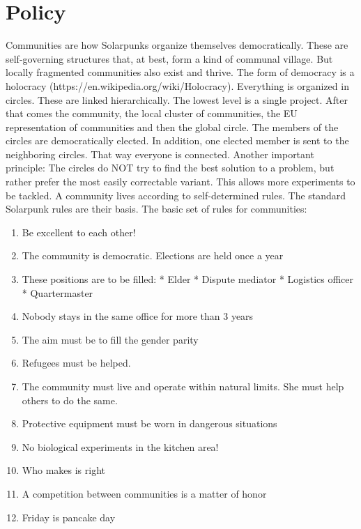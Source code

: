 \section{Policy}
Communities are how Solarpunks organize themselves democratically. These are self-governing structures that, at best, form a kind of communal village. But locally fragmented communities also exist and thrive. The form of democracy is a holocracy (https://en.wikipedia.org/wiki/Holocracy). Everything is organized in circles. These are linked hierarchically. The lowest level is a single project. After that comes the community, the local cluster of communities, the EU
representation of communities and then the global circle.
The members of the circles are democratically elected. In addition, one elected member is sent to the neighboring circles. That way everyone is connected. Another important principle: The circles do NOT try to find the best solution to a problem, but rather prefer the most easily correctable variant. This allows more experiments to be tackled.
A community lives according to self-determined rules. The standard Solarpunk rules are their basis.
The basic set of rules for communities:
\begin{enumerate}
    \item Be excellent to each other!
    \item The community is democratic. Elections are held once a year
    \item These positions are to be filled: * Elder * Dispute mediator * Logistics officer * Quartermaster
    \item Nobody stays in the same office for more than 3 years
    \item The aim must be to fill the gender parity
    \item Refugees must be helped.
    \item The community must live and operate within natural limits. She must help others to do the same.
    \item Protective equipment must be worn in dangerous situations
    \item No biological experiments in the kitchen area!
    \item Who makes is right
    \item A competition between communities is a matter of honor
    \item Friday is pancake day
\end{enumerate}

